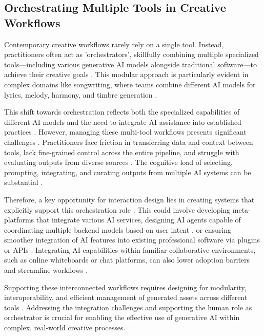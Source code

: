 \subsection{Orchestrating Multiple Tools in Creative Workflows}

Contemporary creative workflows rarely rely on a single tool. Instead, practitioners often act as 'orchestrators', skillfully combining multiple specialized tools—including various generative AI models alongside traditional software—to achieve their creative goals \cite{Palani2024-on}. This modular approach is particularly evident in complex domains like songwriting, where teams combine different AI models for lyrics, melody, harmony, and timbre generation \cite{Huang2020-fh, Uitdenbogerd2023-no}.

This shift towards orchestration reflects both the specialized capabilities of different AI models and the need to integrate AI assistance into established practices \cite{Palani2024-on, Park2024-gw}. However, managing these multi-tool workflows presents significant challenges \cite{Huang2020-fh, Palani2024-on}. Practitioners face friction in transferring data and context between tools, lack fine-grained control across the entire pipeline, and struggle with evaluating outputs from diverse sources \cite{Palani2024-on}. The cognitive load of selecting, prompting, integrating, and curating outputs from multiple AI systems can be substantial \cite{Huang2020-fh, Uitdenbogerd2023-no}.

Therefore, a key opportunity for interaction design lies in creating systems that explicitly support this orchestration role \cite{Palani2024-on}. This could involve developing meta-platforms that integrate various AI services, designing AI agents capable of coordinating multiple backend models based on user intent \cite{Zhang2021-ej, Gottweis2025-kc}, or ensuring smoother integration of AI features into existing professional software via plugins or APIs \cite{Park2024-gw, Huang2020-fh}. Integrating AI capabilities within familiar collaborative environments, such as online whiteboards or chat platforms, can also lower adoption barriers and streamline workflows \cite{Verheijden2023-gn}.

Supporting these interconnected workflows requires designing for modularity, interoperability, and efficient management of generated assets across different tools \cite{Huang2020-fh, Palani2024-on}. Addressing the integration challenges and supporting the human role as orchestrator is crucial for enabling the effective use of generative AI within complex, real-world creative processes.

